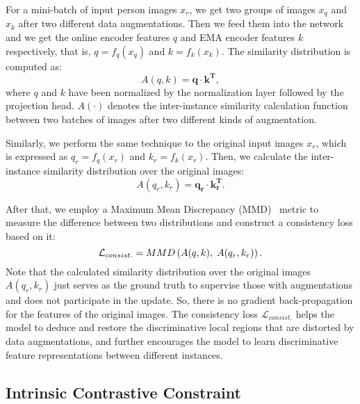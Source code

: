 \documentclass[10pt,twocolumn,letterpaper]{article}
\begin{document}
For a mini-batch of input person images $x_{r}$, we get two groups of images $x_q$ and $x_k$ after two different data augmentations. Then we feed them into the network and we get the online encoder features $q$ and EMA encoder features $k$ respectively, that is, $q=f_q(x_q)$ and $k=f_k(x_k)$. The similarity distribution is computed as:
\begin{equation}
\label{eqn: APD}
    A(q,k) = \bm{q}\cdot\bm{k^T},
\end{equation}
where $q$ and $k$ have been normalized by the normalization layer followed by the projection head. $A(\cdot)$ denotes the inter-instance similarity calculation function between two batches of images after two different kinds of augmentation.


Similarly, we perform the same technique to the original input images $x_{r}$, which is expressed as $q_{r}=f_q(x_{r})$ and $k_{r}=f_k(x_{r})$. Then, we calculate the inter-instance similarity  distribution over the original images:
\begin{equation}
\label{eqn: OPD}
    A(q_r, k_r) = \bm{{q}_{r}}\cdot\bm{{k}^T_{r}}.
\end{equation}

After that, we employ a Maximum Mean Discrepancy (MMD)~\cite{gretton2012kernel} metric to measure the difference between two distributions and construct a consistency loss based on it:
\begin{equation}
\label{eqn:MMD}
    \mathcal{L}_{consist.} = MMD\left(A(q,k), \hspace{1mm}A(q_r, k_r)\right).
\end{equation}
Note that the calculated similarity distribution over the original images $A(q_r, k_r)$ just serves as the ground truth to supervise those with augmentations and does not participate in the update. So, there is no gradient back-propagation for the features of the original images. The consistency loss $\mathcal{L}_{consist.}$ helps the model to deduce and restore the discriminative local regions that are distorted by data augmentations, and further encourages the model to learn discriminative feature representations between different instances.


\subsection{Intrinsic Contrastive Constraint}
\label{section: intrinsic contrastive contraint}


\end{document}

